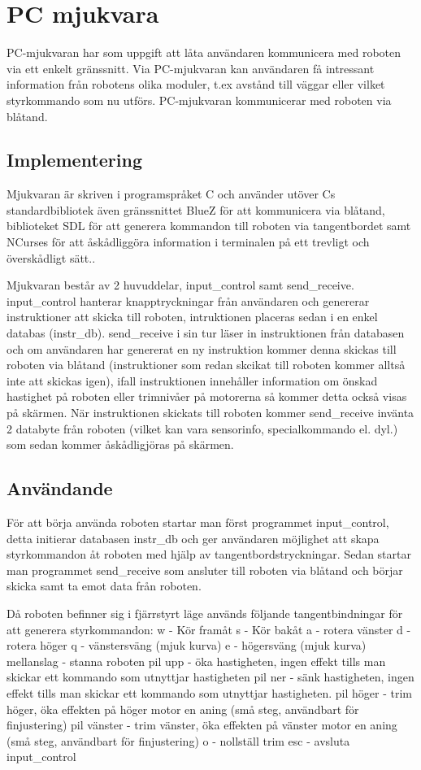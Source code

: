 \section{PC mjukvara}
PC-mjukvaran har som uppgift att låta användaren kommunicera med roboten via ett
enkelt gränssnitt. Via PC-mjukvaran kan användaren få intressant information
från robotens olika moduler, t.ex avstånd till väggar eller vilket styrkommando
som nu utförs. PC-mjukvaran kommunicerar med roboten via blåtand.

\subsection{Implementering}

Mjukvaran är skriven i programspråket C och använder utöver Cs standardbibliotek
även gränssnittet BlueZ för att kommunicera via blåtand, biblioteket SDL för att
generera kommandon till roboten via tangentbordet samt NCurses för att
åskådliggöra information i terminalen på ett trevligt och överskådligt sätt..

Mjukvaran består av 2 huvuddelar, input\_control samt send\_receive. input\_control
hanterar knapptryckningar från användaren och genererar instruktioner att skicka
till roboten, intruktionen placeras sedan i en enkel databas (instr\_db).
send\_receive i sin tur läser in instruktionen från databasen och om användaren
har genererat en ny instruktion kommer denna skickas till roboten via blåtand
(instruktioner som redan skcikat till roboten kommer alltså inte att skickas
 igen), ifall instruktionen innehåller information om önskad hastighet på
roboten eller trimnivåer på motorerna så kommer detta också visas på skärmen.
När instruktionen skickats till roboten kommer send_receive invänta 2 databyte
från roboten (vilket kan vara sensorinfo, specialkommando el. dyl.) som sedan
kommer åskådligjöras på skärmen.
\subsection{Användande}

För att börja använda roboten startar man först programmet input_control, detta
initierar databasen instr\_db och ger användaren möjlighet att skapa
styrkommandon åt roboten med hjälp av tangentbordstryckningar. Sedan startar man
programmet send_receive som ansluter till roboten via blåtand och börjar skicka
samt ta emot data från roboten.

Då roboten befinner sig i fjärrstyrt läge används följande tangentbindningar för
att generera styrkommandon:
w - Kör framåt
s - Kör bakåt
a - rotera vänster
d - rotera höger
q - vänstersväng (mjuk kurva)
e - högersväng (mjuk kurva)
mellanslag - stanna roboten
pil upp - öka hastigheten, ingen effekt tills man skickar ett kommando som
utnyttjar hastigheten
pil ner - sänk hastigheten, ingen effekt tills man skickar ett kommando som
utnyttjar hastigheten.
pil höger - trim höger, öka effekten på höger motor en aning (små steg,
		användbart för finjustering)
pil vänster - trim vänster, öka effekten på vänster motor en aning (små steg,
		användbart för finjustering)
o - nollställ trim
esc - avsluta input\_control

